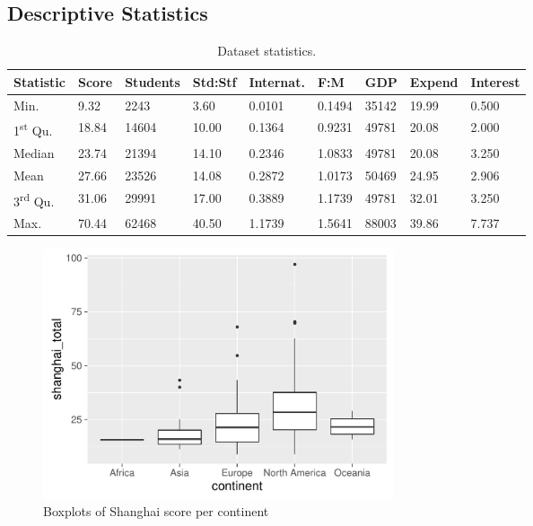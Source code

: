 \documentclass{stats_apa_style2}
\begin{document}
\subsection*{Descriptive Statistics}
\begin{table}
	\centering
	\begin{tabular}{lllllllll}
  \hline
 Statistic & Score &  Students & Std:Stf & Internat. & F:M & GDP & Expend &    Interest \\ 
  \hline
  Min.   & 9.32   &  2243   &  3.60   & 0.0101   & 0.1494   & 35142   & 19.99   & 0.500   \\ 
  1\textsuperscript{st} Qu. & 18.84   & 14604   & 10.00   & 0.1364   & 0.9231   & 49781   & 20.08   & 2.000  \\ 
  Median  & 23.74   & 21394   & 14.10   & 0.2346   & 1.0833   & 49781   & 20.08   & 3.250   \\ 
  Mean    & 27.66   & 23526   & 14.08   & 0.2872   & 1.0173   & 50469   & 24.95   & 2.906   \\ 
  3\textsuperscript{rd} Qu. & 31.06   & 29991   & 17.00   & 0.3889   & 1.1739   & 49781   & 32.01   & 3.250   \\ 
  Max.    & 70.44   & 62468   & 40.50   & 1.1739   & 1.5641   & 88003   & 39.86   & 7.737   \\ 
   \hline
		
	\end{tabular}
	\caption{Dataset statistics.}
	\label{table:summary}
\end{table}

\begin{figure}
\centering
	\includegraphics[width=0.5\textwidth]{graphs/continents_boxplot}
	\caption{Boxplots of Shanghai score per continent}
	\label{fig:boxcontinent}
\end{figure}
\end{document}
